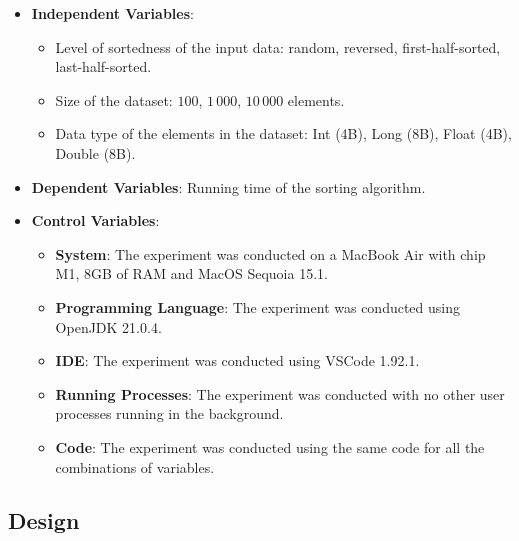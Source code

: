\documentclass[unicode,11pt,a4paper,oneside,numbers=endperiod,openany]{scrartcl}
\begin{document}
    \begin{itemize}

        \item \textbf{Independent Variables}:
        
        \begin{itemize}
            \item Level of sortedness of the input data: random, reversed, first-half-sorted, last-half-sorted.
            \item Size of the dataset: $100$, $1\,000$, $10\,000$ elements.
            \item Data type of the elements in the dataset: Int (4B), Long (8B), Float (4B), Double (8B).
        \end{itemize}

        \item \textbf{Dependent Variables}: Running time of the sorting algorithm.
        
        \item \textbf{Control Variables}: 

        \begin{itemize}
            \item \textbf{System}: The experiment was conducted on a MacBook Air with chip M1, 8GB of RAM and MacOS Sequoia 15.1.
            \item \textbf{Programming Language}: The experiment was conducted using OpenJDK 21.0.4.
            \item \textbf{IDE}: The experiment was conducted using VSCode 1.92.1.
            \item \textbf{Running Processes}: The experiment was conducted with no other user processes running in the background.
            \item \textbf{Code}: The experiment was conducted using the same code for all the combinations of variables.
        \end{itemize}

    \end{itemize}


    \subsection{Design}
\end{document}
